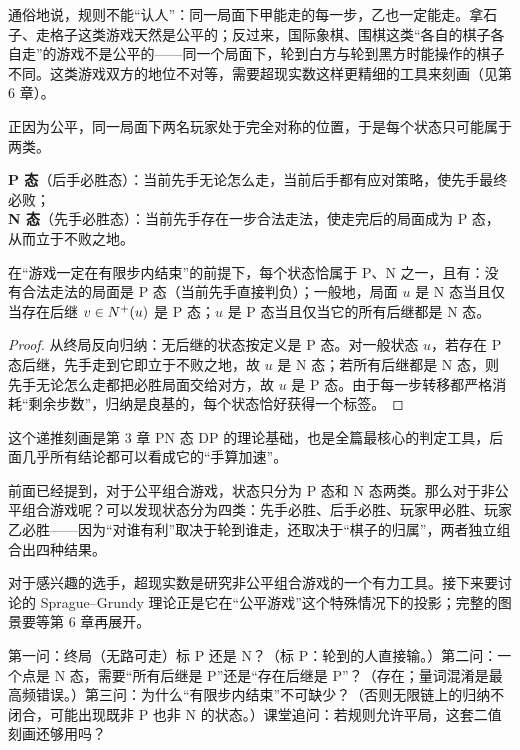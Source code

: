 通俗地说，规则不能“认人”：同一局面下甲能走的每一步，乙也一定能走。拿石子、走格子这类游戏天然是公平的；反过来，国际象棋、围棋这类“各自的棋子各自走”的游戏不是公平的——同一个局面下，轮到白方与轮到黑方时能操作的棋子不同。这类游戏双方的地位不对等，需要超现实数这样更精细的工具来刻画（见第 6 章）。

正因为公平，同一局面下两名玩家处于完全对称的位置，于是每个状态只可能属于两类。

\begin{definition}[P 态与 N 态]\label{def:pn}
\textbf{P 态}（后手必胜态）：当前先手无论怎么走，当前后手都有应对策略，使先手最终必败；\\
\textbf{N 态}（先手必胜态）：当前先手存在一步合法走法，使走完后的局面成为 P 态，从而立于不败之地。
\end{definition}

\begin{theorem}[递推刻画]\label{thm:recursion}
在“游戏一定在有限步内结束”的前提下，每个状态恰属于 P、N 之一，且有：没有合法走法的局面是 P 态（当前先手直接判负）；一般地，局面 $u$ 是 N 态当且仅当存在后继 $v\in N^+(u)$ 是 P 态；$u$ 是 P 态当且仅当它的所有后继都是 N 态。
\end{theorem}
\begin{proof}
从终局反向归纳：无后继的状态按定义是 P 态。对一般状态 $u$，若存在 P 态后继，先手走到它即立于不败之地，故 $u$ 是 N 态；若所有后继都是 N 态，则先手无论怎么走都把必胜局面交给对方，故 $u$ 是 P 态。由于每一步转移都严格消耗“剩余步数”，归纳是良基的，每个状态恰好获得一个标签。
\end{proof}

这个递推刻画是第 3 章 PN 态 DP 的理论基础，也是全篇最核心的判定工具，后面几乎所有结论都可以看成它的“手算加速”。

前面已经提到，对于公平组合游戏，状态只分为 P 态和 N 态两类。那么对于非公平组合游戏呢？可以发现状态分为四类：先手必胜、后手必胜、玩家甲必胜、玩家乙必胜——因为“对谁有利”取决于轮到谁走，还取决于“棋子的归属”，两者独立组合出四种结果。

对于感兴趣的选手，超现实数是研究非公平组合游戏的一个有力工具。接下来要讨论的 Sprague--Grundy 理论正是它在“公平游戏”这个特殊情况下的投影；完整的图景要等第 6 章再展开。

\begin{teach}[P/N 递推刻画的课堂三问]
第一问：终局（无路可走）标 P 还是 N？（标 P：轮到的人直接输。）第二问：一个点是 N 态，需要“所有后继是 P”还是“存在后继是 P”？（存在；量词混淆是最高频错误。）第三问：为什么“有限步内结束”不可缺少？（否则无限链上的归纳不闭合，可能出现既非 P 也非 N 的状态。）课堂追问：若规则允许平局，这套二值刻画还够用吗？
\end{teach}
